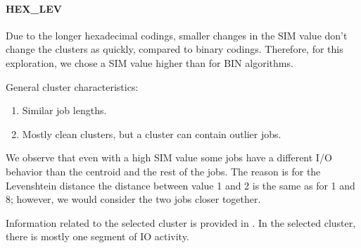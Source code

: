 \documentclass{jhps}
\begin{document}
\paragraph{HEX\_LEV}
Due to the longer hexadecimal codings, smaller changes in the SIM value don't change the clusters as quickly,  compared to binary codings.
Therefore, for this exploration, we chose a SIM value higher than for BIN algorithms.

General cluster characteristics:
\begin{enumerate}
 \item Similar job lengths.
 \item Mostly clean clusters, but a cluster can contain outlier jobs.
\end{enumerate}

We observe that even with a high SIM value some jobs have a different I/O behavior than the centroid and the rest of the jobs.
The reason is for the Levenshtein distance the distance between value 1 and 2 is the same as for 1 and 8; however, we would consider the two jobs closer together.

Information related to the selected cluster is provided in .
In the selected cluster, there is mostly one segment of IO activity.
\end{document}
